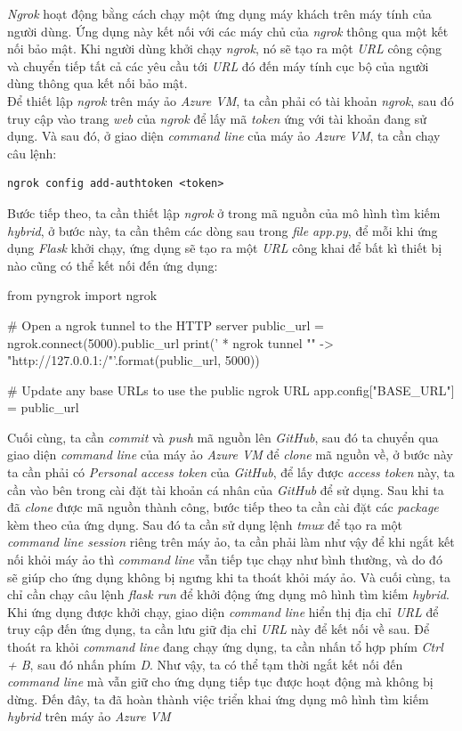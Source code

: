\hspace*{1cm}
\textit{Ngrok} hoạt động bằng cách chạy một ứng dụng máy khách trên máy tính của người dùng. Ứng dụng này kết nối với các máy chủ của \textit{ngrok} thông qua một kết nối bảo mật. Khi người dùng khởi chạy \textit{ngrok}, nó sẽ tạo ra một \textit{URL} công cộng và chuyển tiếp tất cả các yêu cầu tới \textit{URL} đó đến máy tính cục bộ của người dùng thông qua kết nối bảo mật.\\
\hspace*{1cm}
Để thiết lập \textit{ngrok} trên máy ảo \textit{Azure VM}, ta cần phải có tài khoản \textit{ngrok}, sau đó truy cập vào trang \textit{web} của \textit{ngrok} để lấy mã \textit{token} ứng với tài khoản đang sử dụng. Và sau đó, ở giao diện \textit{command line} của máy ảo \textit{Azure VM}, ta cần chạy câu lệnh:
\begin{lstlisting}
ngrok config add-authtoken <token>
\end{lstlisting}
\hspace*{1cm}
Bước tiếp theo, ta cần thiết lập \textit{ngrok} ở trong mã nguồn của mô hình tìm kiếm \textit{hybrid}, ở bước này, ta cần thêm các dòng sau trong \textit{file app.py}, để mỗi khi ứng dụng \textit{Flask} khởi chạy, ứng dụng sẽ tạo ra một \textit{URL} công khai để bất kì thiết bị nào cũng có thể kết nối đến ứng dụng:
\begin{python}
from pyngrok import ngrok

# Open a ngrok tunnel to the HTTP server
public_url = ngrok.connect(5000).public_url
print(' * ngrok tunnel "{}" -> "http://127.0.0.1:{}/"'.format(public_url, 5000))

# Update any base URLs to use the public ngrok URL
app.config["BASE_URL"] = public_url
\end{python}
\hspace*{1cm}
Cuối cùng, ta cần \textit{commit} và \textit{push} mã nguồn lên \textit{GitHub}, sau đó ta chuyển qua giao diện \textit{command line} của máy ảo \textit{Azure VM} để \textit{clone} mã nguồn về, ở bước này ta cần phải có \textit{Personal access token} của \textit{GitHub}, để lấy được \textit{access token} này, ta cần vào bên trong cài đặt tài khoản cá nhân của \textit{GitHub} để sử dụng. Sau khi ta đã \textit{clone} được mã nguồn thành công, bước tiếp theo ta cần cài đặt các \textit{package} kèm theo của ứng dụng. Sau đó ta cần sử dụng lệnh \textit{tmux} để tạo ra một \textit{command line session} riêng trên máy ảo, ta cần phải làm như vậy để khi ngắt kết nối khỏi máy ảo thì \textit{command line} vẫn tiếp tục chạy như bình thường, và do đó sẽ giúp cho ứng dụng không bị ngưng khi ta thoát khỏi máy ảo. Và cuối cùng, ta chỉ cần chạy câu lệnh \textit{flask run} để khởi động ứng dụng mô hình tìm kiếm \textit{hybrid}. Khi ứng dụng được khởi chạy, giao diện \textit{command line} hiển thị địa chỉ \textit{URL} để truy cập đến ứng dụng, ta cần lưu giữ địa chỉ \textit{URL} này để kết nối về sau. Để thoát ra khỏi \textit{command line} đang chạy ứng dụng, ta cần nhấn tổ hợp phím \textit{Ctrl + B}, sau đó nhấn phím \textit{D}. Như vậy, ta có thể tạm thời ngắt kết nối đến \textit{command line} mà vẫn giữ cho ứng dụng tiếp tục được hoạt động mà không bị dừng. Đến đây, ta đã hoàn thành việc triển khai ứng dụng mô hình tìm kiếm \textit{hybrid} trên máy ảo \textit{Azure VM}